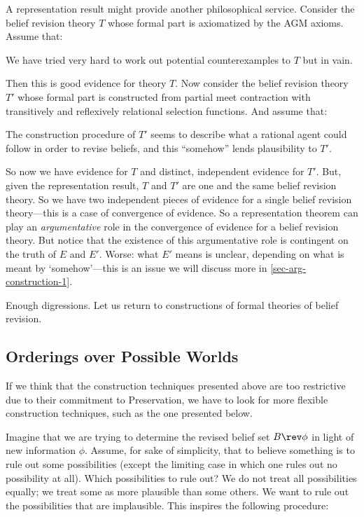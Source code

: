A representation result might provide another philosophical service. Consider the belief revision theory $T$ whose formal part is axiomatized by the AGM axioms. Assume that: \op

	\im[($E$)] We have tried very hard to work out potential counterexamples to $T$ but in vain. 

\ed Then this is good evidence for theory $T$. Now consider the belief revision theory $T'$ whose formal part is constructed from partial meet contraction with transitively and reflexively relational selection functions. And assume that: \op

	\im[($E'$)] The construction procedure of $T'$ seems to describe what a rational agent could follow in order to revise beliefs, and this ``somehow'' lends plausibility to $T'$. 

\ed So now we have evidence for $T$ and distinct, independent evidence for $T'$. But, given the representation result, $T$ and $T'$ are one and the same belief revision theory. So we have two independent pieces of evidence for a single belief revision theory---this is a case of convergence of evidence. So a representation theorem can play an {\em argumentative} role in the convergence of evidence for a belief revision theory. But notice that the existence of this argumentative role is contingent on the truth of $E$ and $E'$. Worse: what $E'$ means is unclear, depending on what is meant by `somehow'---this is an issue we will discuss more in \autoref{sec-arg-construction-1}.

Enough digressions. Let us return to constructions of formal theories of belief revision.

\subsection{Orderings over Possible Worlds}\label{sec-ordering}

If we think that the construction techniques presented above are too restrictive due to their commitment to Preservation, we have to look for more flexible construction techniques, such as the one presented below. 

Imagine that we are trying to determine the revised belief set $B \rev \phi$ in light of new information $\phi$. Assume, for sake of simplicity, that to believe something is to rule out some possibilities (except the limiting case in which one rules out no possibility at all). Which possibilities to rule out? We do not treat all possibilities equally; we treat some as more plausible than some others. We want to rule out the possibilities that are implausible. This inspires the following procedure: \op

